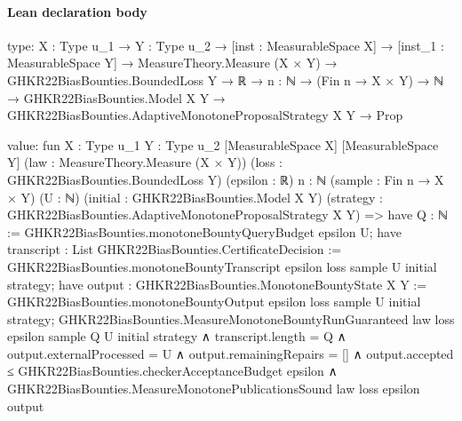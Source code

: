 \documentclass[10pt]{article}
\begin{document}
\paragraph{Lean declaration body}
\begin{ReviewVerbatim}
type:
{X : Type u_1} →
  {Y : Type u_2} →
    [inst : MeasurableSpace X] →
      [inst_1 : MeasurableSpace Y] →
        MeasureTheory.Measure (X × Y) →
          GHKR22BiasBounties.BoundedLoss Y →
            ℝ →
              {n : ℕ} →
                (Fin n → X × Y) →
                  ℕ → GHKR22BiasBounties.Model X Y → GHKR22BiasBounties.AdaptiveMonotoneProposalStrategy X Y → Prop

value:
fun {X : Type u_1} {Y : Type u_2} [MeasurableSpace X] [MeasurableSpace Y] (law : MeasureTheory.Measure (X × Y))
    (loss : GHKR22BiasBounties.BoundedLoss Y) (epsilon : ℝ) {n : ℕ} (sample : Fin n → X × Y) (U : ℕ)
    (initial : GHKR22BiasBounties.Model X Y) (strategy : GHKR22BiasBounties.AdaptiveMonotoneProposalStrategy X Y) =>
  have Q : ℕ := GHKR22BiasBounties.monotoneBountyQueryBudget epsilon U;
  have transcript : List GHKR22BiasBounties.CertificateDecision :=
    GHKR22BiasBounties.monotoneBountyTranscript epsilon loss sample U initial strategy;
  have output : GHKR22BiasBounties.MonotoneBountyState X Y :=
    GHKR22BiasBounties.monotoneBountyOutput epsilon loss sample U initial strategy;
  GHKR22BiasBounties.MeasureMonotoneBountyRunGuaranteed law loss epsilon sample Q U initial strategy ∧
    transcript.length = Q ∧
      output.externalProcessed = U ∧
        output.remainingRepairs = [] ∧
          output.accepted ≤ GHKR22BiasBounties.checkerAcceptanceBudget epsilon ∧
            GHKR22BiasBounties.MeasureMonotonePublicationsSound law loss epsilon output
\end{ReviewVerbatim}
\end{document}
